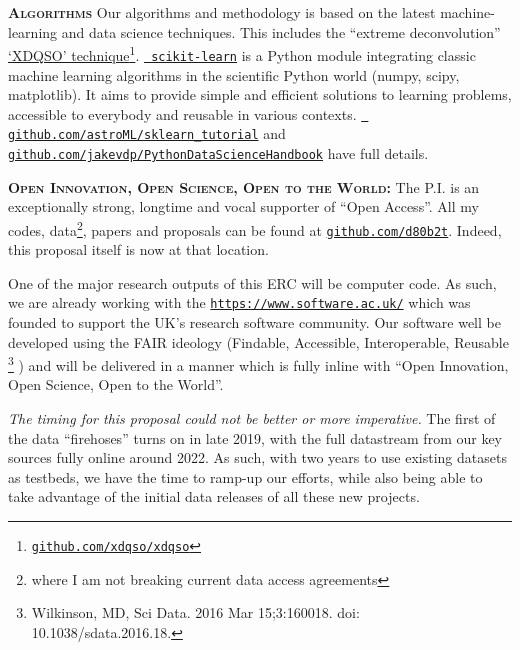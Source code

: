 \smallskip
\smallskip
\noindent
\textbf{\textsc{Algorithms}}
Our algorithms and methodology is based on the latest machine-learning and data science techniques. 
This includes the ``extreme deconvolution'' \href{http://www.sdss.org/dr14/data\_access/value-added-catalogs/?vac\_id=xdqso/}{`XDQSO' technique}\footnote{\href{https://github.com/xdqso/xdqso}{\tt github.com/xdqso/xdqso}}.
\href{http://ogrisel.github.io/scikit-learn.org/sklearn-tutorial/index.html}{\tt
scikit-learn} is a Python module integrating classic machine learning
algorithms in the scientific Python world (numpy, scipy,
matplotlib). It aims to provide simple and efficient solutions to
learning problems, accessible to everybody and reusable in various
contexts.  \href{https://github.com/astroML/sklearn\_tutorial}{{\tt
github.com/astroML/sklearn\_tutorial}} and \href{https://github.com/jakevdp/PythonDataScienceHandbook}{{\tt github.com/jakevdp/PythonDataScienceHandbook}} have full details.


\smallskip
\smallskip
\noindent
\textbf{\textsc{Open Innovation, Open Science, Open to the World:}} 
The P.I. is an exceptionally strong, longtime and vocal supporter of ``Open Access''. 
All my codes, data\footnote{where I am not breaking current data access agreements}, papers 
and proposals can be found at \href{github.com/d80b2t}{{\tt github.com/d80b2t}}. 
Indeed, this proposal itself is now at that location. 

\smallskip
\smallskip
\noindent
One of the major research outputs of this ERC will be computer code.
As such, we are already working with the \href{The Software
Sustainability Institute}{\tt https://www.software.ac.uk/} which was
founded to support the UK’s research software community.  Our software
well be developed using the FAIR ideology (Findable, Accessible,
Interoperable, Reusable \footnote{Wilkinson, MD, Sci Data. 2016 Mar
15;3:160018. doi: 10.1038/sdata.2016.18.}  )  and will be delivered in
a manner which is fully inline with ``Open Innovation, Open Science,
Open to the World''.

\smallskip
\smallskip
\noindent
{\it The timing for this proposal could not be better or more imperative.} 
The first of the data ``firehoses'' turns on in late 2019, with
the full datastream from our key sources fully online around 2022. 
As such, with two years to use existing datasets as testbeds, we 
have the time to ramp-up our efforts, while also being able to 
take advantage of the initial data releases of all these new projects. 





